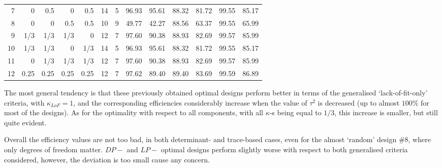 \begin{table}[h]
\begin{center}
{\begin{tabular}{rrrrrrrrrrrrr}
7 & 0 & 0.5 & 0 & 0.5 & \multicolumn{1}{|r}{14} & 5 & \multicolumn{1}{|r}{96.93} & 95.61 & \multicolumn{1}{|r}{88.32} & 81.72 & \multicolumn{1}{|r}{99.55} & 85.17 \\
8 & 0 & 0 & 0.5 & 0.5 & \multicolumn{1}{|r}{10} & 9 & \multicolumn{1}{|r}{49.77} & 42.27 & \multicolumn{1}{|r}{88.56} & 63.37 & \multicolumn{1}{|r}{99.55} & 65.99 \\
9 & 1/3 & 1/3 & 1/3 & 0 & \multicolumn{1}{|r}{12} & 7 & \multicolumn{1}{|r}{97.60} & 90.38 & \multicolumn{1}{|r}{88.93} & 82.69 & \multicolumn{1}{|r}{99.57} & 85.99 \\
10 & 1/3 & 1/3 & 0 & 1/3 & \multicolumn{1}{|r}{14} & 5 & \multicolumn{1}{|r}{96.93} & 95.61 & \multicolumn{1}{|r}{88.32} & 81.72 & \multicolumn{1}{|r}{99.55} & 85.17 \\
11 & 0 & 1/3 & 1/3 & 1/3 & \multicolumn{1}{|r}{12} & 7 & \multicolumn{1}{|r}{97.60} & 90.38 & \multicolumn{1}{|r}{88.93} & 82.69 & \multicolumn{1}{|r}{99.57} & 85.99 \\
12 & 0.25 & 0.25 & 0.25 & 0.25 & \multicolumn{1}{|r}{12} & 7 & \multicolumn{1}{|r}{97.62} & 89.40 & \multicolumn{1}{|r}{89.40} & 83.69 & \multicolumn{1}{|r}{99.59} & 86.89 
\end{tabular}
}
\end{center}
\end{table}

The most general tendency is that these previously obtained optimal designs perform better in terms of the generalised `lack-of-fit-only' criteria, with $\kappa_{LoF}=1$, and the corresponding efficiencies considerably increase when the value of $\tau^2$ is decreased (up to almost $100\%$ for most of the designs). As for the optimality with respect to all components, with all $\kappa$-s being equal to $1/3$, this increase is smaller, but still quite evident. 

Overall the efficiency values are not too bad, in both determinant- and trace-based cases, even for the almost `random' design $\#8$, where only degrees of freedom matter. $DP-$ and $LP-$ optimal designs perform slightly worse with respect to both generalised criteria considered, however, the deviation is too small cause any concern.


